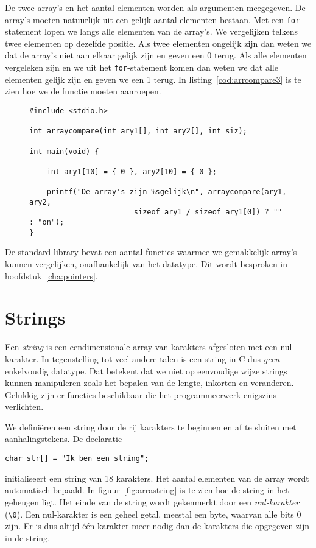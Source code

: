 De twee array's en het aantal elementen worden als argumenten meegegeven. De array's moeten natuurlijk uit een gelijk aantal elementen bestaan. Met een \texttt{for}-statement lopen we langs alle elementen van de array's. We vergelijken telkens twee elementen op dezelfde positie. Als twee elementen ongelijk zijn dan weten we dat de array's niet aan elkaar gelijk zijn en geven een 0 terug. Als alle elementen vergeleken zijn en we uit het \texttt{for}-statement komen dan weten we dat alle elementen gelijk zijn en geven we een 1 terug. In listing~\ref{cod:arrcompare3} is te zien hoe we de functie moeten aanroepen.

\begin{figure}[!ht]
\begin{lstlisting}[caption=Vergelijken van twee array's.,label=cod:arrcompare3]
#include <stdio.h>

int arraycompare(int ary1[], int ary2[], int siz);
	
int main(void) {

	int ary1[10] = { 0 }, ary2[10] = { 0 };

	printf("De array's zijn %sgelijk\n", arraycompare(ary1, ary2,
                        sizeof ary1 / sizeof ary1[0]) ? "" : "on");
}
\end{lstlisting}
\end{figure}

De standard library bevat een aantal functies waarmee we gemakkelijk array's kunnen vergelijken, onafhankelijk van het datatype. Dit wordt besproken in hoofdstuk~\ref{cha:pointers}.

\section{Strings}
Een \textsl{string} is een eendimensionale array van karakters afgesloten met een nul-karakter. In tegenstelling tot veel andere talen is een string in C dus \textsl{geen} enkelvoudig datatype. Dat betekent dat we niet op eenvoudige wijze strings kunnen manipuleren zoals het bepalen van de lengte, inkorten en veranderen. Gelukkig zijn er functies beschikbaar die het programmeerwerk enigszins verlichten. 

We definiëren een string door de rij karakters te beginnen en af te sluiten met aanhalingstekens. De declaratie

\hspace*{1em}\texttt{char str[] = "Ik ben een string";}

initialiseert een string van 18 karakters. Het aantal elementen van de array wordt automatisch bepaald.
In figuur~\ref{fig:arrastring} is te zien hoe de string in het geheugen ligt. Het einde van de string wordt gekenmerkt door een \textsl{nul-karakter} (\texttt{\textbackslash 0}). Een nul-karakter is een geheel getal, meestal een byte, waarvan alle bits 0 zijn. Er is dus altijd één karakter meer nodig dan de karakters die opgegeven zijn in de string.

